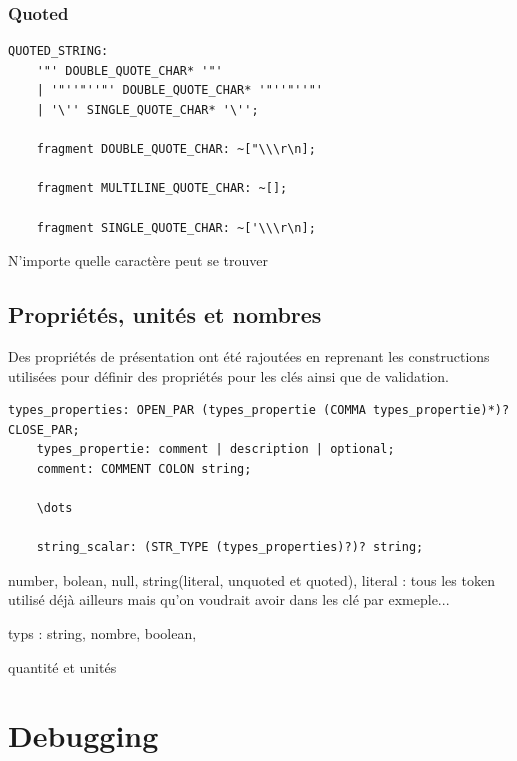 \documentclass[
    iict, %
    il, %
]{heig-tb}
\begin{document}
\subsubsection{Quoted}

\begin{lstlisting}[frame=single,caption={quoted},label={quoted}]
    QUOTED_STRING:
    '"' DOUBLE_QUOTE_CHAR* '"'
    | '"''"''"' DOUBLE_QUOTE_CHAR* '"''"''"'
    | '\'' SINGLE_QUOTE_CHAR* '\'';

    fragment DOUBLE_QUOTE_CHAR: ~["\\\r\n];

    fragment MULTILINE_QUOTE_CHAR: ~[];

    fragment SINGLE_QUOTE_CHAR: ~['\\\r\n];
\end{lstlisting}

N'importe quelle caractère peut se trouver


\subsection{Propriétés, unités et nombres}

Des propriétés de présentation ont été rajoutées en reprenant les constructions utilisées pour définir des propriétés pour les clés ainsi que de validation.

\begin{lstlisting}[frame=single,caption={types properties},label={types_properties}]
    types_properties: OPEN_PAR (types_propertie (COMMA types_propertie)*)? CLOSE_PAR;
    types_propertie: comment | description | optional;
    comment: COMMENT COLON string;

    \dots

    string_scalar: (STR_TYPE (types_properties)?)? string;
\end{lstlisting}

number, bolean, null, string(literal, unquoted et quoted),
literal : tous les token utilisé déjà ailleurs mais qu'on voudrait avoir dans les clé par exmeple...

typs : string, nombre, boolean,

quantité et unités



\section{Debugging}
\end{document}
